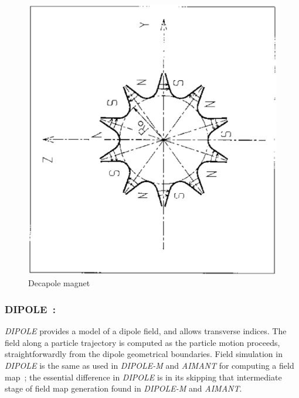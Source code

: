 {%
\begin{figure}[H]
\centerline{\includegraphics[width=12cm,angle=-90]{Fig18.ps}}
\caption{\label{fig18}Decapole magnet}
\end{figure}
\vfill








\newpage

\subsubsection*{DIPOLE~: \DIPOLETitl} \label{DIPOLE} 
\medskip

\noindent\textsl{DIPOLE} provides a model of a dipole field, and allows transverse indices.  
 The field along a particle trajectory is computed as the 
particle motion proceeds, straightforwardly from the dipole geometrical boundaries. 
Field simulation  in \textsl{DIPOLE}  is the same as used in \textsl{DIPOLE-M} and \textsl{AIMANT} 
for computing a field map~; the essential difference in \textsl{DIPOLE} is in its skipping that 
intermediate stage of field map generation found in \textsl{DIPOLE-M} and \textsl{AIMANT}. 

\bigskip

}
